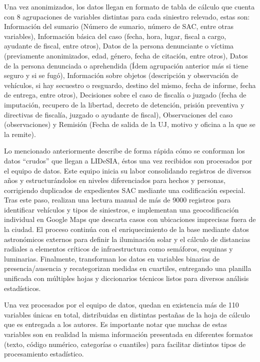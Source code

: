 Una vez anonimizados, los datos llegan en formato de tabla de cálculo que cuenta con 8 agrupaciones de variables distintas para cada siniestro relevado, estas son: Información del sumario (Número de sumario, número de SAC, entre otras variables), Información básica del caso (fecha, hora, lugar, fiscal a cargo, ayudante de fiscal, entre otros), Datos de la persona denunciante o víctima (previamente anonimizados, edad, género, fecha de citación, entre otros), Datos de la persona denunciada o aprehendida (Ídem agrupación anterior más si tiene seguro y si se fugó), Información sobre objetos (descripción y observación de vehículos, si hay secuestro o resguardo, destino del mismo, fecha de informe, fecha de entrega, entre otros), Decisiones sobre el caso de fiscalía o juzgado (fecha de imputación, recupero de la libertad, decreto de detención, prisión preventiva y directivas de fiscalía, juzgado o ayudante de fiscal), Observaciones del caso (observaciones) y Remisión (Fecha de salida de la UJ, motivo y oficina a la que se la remite).

Lo mencionado anteriormente describe de forma rápida cómo se conforman los datos ``crudos'' que llegan a LIDeSIA, éstos una vez recibidos son procesados por el equipo de datos. Este equipo inicia su labor consolidando registros de diversos años y estructurándolos en niveles diferenciados para hechos y personas, corrigiendo duplicados de expedientes SAC mediante una codificación especial. Tras este paso, realizan una lectura manual de más de \num{9000} registros para identificar vehículos y tipos de siniestros, e implementan una geocodificación individual en Google Maps que descarta casos con ubicaciones imprecisas fuera de la ciudad. El proceso continúa con el enriquecimiento de la base mediante datos astronómicos externos para definir la iluminación solar y el cálculo de distancias radiales a elementos críticos de infraestructura como semáforos, esquinas y luminarias. Finalmente, transforman los datos en variables binarias de presencia/ausencia y recategorizan medidas en cuartiles, entregando una planilla unificada con múltiples hojas y diccionarios técnicos listos para diversos análisis estadísticos.

Una vez procesados por el equipo de datos, quedan en existencia más de 110 variables únicas en total, distribuidas en distintas pestañas de la hoja de cálculo que es entregada a los autores. Es importante notar que muchas de estas variables son en realidad la misma información presentada en diferentes formatos (texto, código numérico, categorías o cuantiles) para facilitar distintos tipos de procesamiento estadístico.


